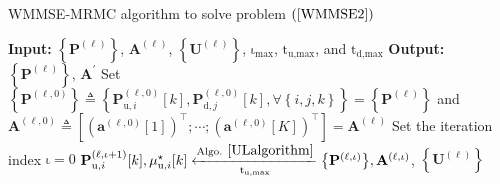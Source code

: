 \documentclass[9pt,journal]{IEEEtran}
\newcommand{\paren}[1]{\left({#1}\right)}
\newcommand{\bracket}[1]{{\left [{#1}\right ]}}
\newcommand{\braces}[1]{{\left\{ {#1}\right\}}}
\newcommand{\PiB}{\mathbf{P}_{\textrm{u},i}\bracket{k}}
\theoremstyle{definition}
\begin{document}
\begin{algorithm}[ht!]
	\caption{WMMSE-MRMC algorithm to solve problem $\paren{\ref{WMMSE2}}$}
	\label{convexalgorithm}
	\begin{algorithmic}[1]
		\Statex \textbf{Input:} $\braces{\mathbf{P}^{\paren{\mathrm{\ell}}}}$, $\mathbf{A}^{\paren{\mathrm{\ell}}}$, $\braces{\mathbf{U}^{\paren{\mathrm{\ell}}}}$, $\mathrm{\iota}_{\textrm{max}}$, $\mathrm{t}_{\textrm{u,max}}$, and $\mathrm{t}_{\textrm{d,max}}$
		\Statex \textbf{Output: } $\braces{\mathbf{P}^{\paren{\ell}}}$, $\mathbf{A}^{\prime}$
		\State Set $\braces{\mathbf{P}^{\paren{\mathrm{\ell,0}}}}\triangleq\braces{\mathbf{P}^{\paren{\mathrm{\ell,0}}}_{\textrm{u},i}\bracket{k},\mathbf{P}^{\paren{\mathrm{\ell,0}}}_{\textrm{d},j}\bracket{k}, \forall \braces{i,j,k}}=\braces{\mathbf{P}^{\paren{\mathrm{\ell}}}}
		$ and $\mathbf{A}^{\paren{\mathrm{\ell,0}}}\triangleq\bracket{\paren{\mathbf{a}^{\paren{\mathrm{\ell,0}}}\bracket{1}}^\top;\cdots;\paren{\mathbf{a}^{\paren{\mathrm{\ell,0}}}\bracket{\mathrm{\mathit{K}}}}^\top}=\mathbf{A}^{\paren{\mathrm{\ell}}}$
		\State Set the iteration index $\mathrm{\iota}=0$ 
		\Repeat
		\label{stepk} %
		\State $\mathbf{P}^{\paren{\mathrm{\ell,\iota+1}}}_{\textrm{u},i}\bracket{k},\mu^\star_{\textrm{u},i}\bracket{k}\xleftarrow[\mathrm{t}_{\textrm{u,max}}]{\textrm{Algo. }\ref{ULalgorithm}}\braces{\mathbf{P}^{\paren{\mathrm{\ell,\iota}}}},\mathbf{A}^{\paren{\mathrm{\ell,\iota}}}$, $\braces{\mathbf{U}^{\paren{\mathrm{\ell}}}}$
		\EndFor

\end{algorithmic}
\end{algorithm}
\end{document}
